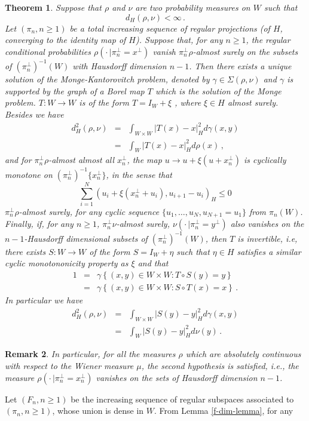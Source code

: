 \documentclass[12pt,a4paper]{book}
\newtheorem{theorem}{Theorem}[section]
\newtheorem{remarkk}[theorem]{Remark}
\newcommand{\beaa}{\begin{eqnarray*}}
\newcommand{\eeaa}{\end{eqnarray*}}
\newcommand{\ga}{\gamma}
\newcommand{\proof}{\noindent {\bf Proof:\ }}
\begin{document}
\begin{theorem}
\label{monge-general}
Suppose that $\rho$ and $\nu$ are two probability measures on
$W$ such  that
$$
d_H(\rho,\nu)<\infty\,.
$$
Let $(\pi_n,n\geq 1)$ be a total increasing  sequence of regular
projections (of $H$, converging to the identity map of $H$). 
Suppose  that, for any $n\geq 1$, the regular
conditional probabilities $\rho(\cdot\,|\pi_n^\bot=x^\bot)$ vanish
$\pi_n^\bot\rho$-almost surely on 
the subsets of  $(\pi_n^\bot)^{-1}(W)$ with Hausdorff dimension
$n-1$. Then there exists a    
unique solution of the   Monge-Kantorovitch problem, denoted by $\ga\in
\Sigma(\rho,\nu)$ and  $\ga$ is supported by the graph of a Borel
map $T$ which is the solution of the
Monge problem.  $T:W\to W$ is  of the form $T=I_W+\xi$ , where $\xi\in
H$ almost surely. Besides  we have 
\beaa
d_H^2(\rho,\nu)&=&\int_{W\times W}|T(x)-x|_H^2d\ga(x,y)\\
&=&\int_{W}|T(x)-x|_H^2d\rho(x)\,, 
\eeaa
and  
for $\pi_n^\bot\rho$-almost almost all $x_n^\bot$, the map $u\to
u+\xi(u+x_n^\bot)$ is cyclically monotone on
$(\pi_n^\bot)^{-1}\{x_n^\bot\}$, in the sense that 
$$
\sum_{i=1}^N\left(u_i+\xi(x_n^\bot+u_i),u_{i+1}-u_i\right)_H\leq 0
$$
$\pi_n^\bot\rho$-almost surely, for any cyclic sequence
$\{u_1,\ldots,u_N,u_{N+1}=u_1\}$ from $\pi_n(W)$. Finally, if, for any $n\geq
1$, $\pi_n^\bot\nu$-almost surely,  $\nu(\cdot\,|\pi_n^\bot=y^\bot)$
 also vanishes on the $n-1$-Hausdorff dimensional  subsets  
 of $(\pi_n^\bot)^{-1}(W)$, then $T$ is invertible, i.e, there exists
 $S:W\to W$ of the form $S=I_W+\eta$ such that  $\eta\in H$ satisfies
 a similar  cyclic monotononicity property as $\xi$ and that 
\beaa
1&=&\ga\left\{(x,y)\in W\times W: T\circ S(y)=y\right\}\\
&=&\ga\left\{(x,y)\in W\times W: S\circ T(x)=x\right\}\,.
\eeaa
In particular we have 
\beaa
d_H^2(\rho,\nu)&=&\int_{W\times W}|S(y)-y|_H^2d\ga(x,y)\\
&=&\int_{W}|S(y)-y|_H^2d\nu(y)\,. 
\eeaa
\end{theorem}
\begin{remarkk}
In particular, for all  the measures $\rho$ which are  absolutely
continuous with respect to the  Wiener measure $\mu$,  the second
hypothesis is satisfied, i.e., the measure
$\rho(\cdot\,|\pi_n^\bot=x_n^\bot)$ vanishes on the sets of Hausdorff
dimension $n-1$.
\end{remarkk} 
\proof
Let $(F_n,n\geq 1)$ be the  increasing sequence of regular subspaces 
associated to $(\pi_n,n\geq 1)$,  
 whose union is dense in $W$.  From Lemma \ref{f-dim-lemma}, for any
\end{document}
